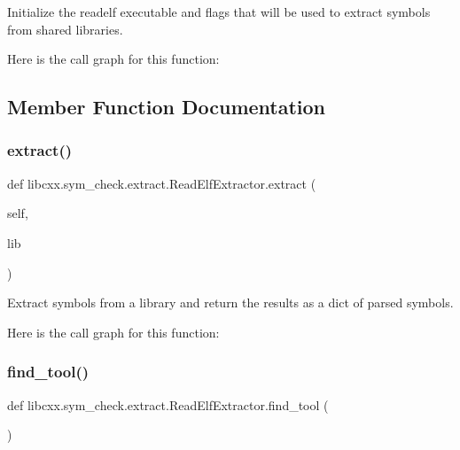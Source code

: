 \begin{DoxyVerb}Initialize the readelf executable and flags that will be used to
extract symbols from shared libraries.
\end{DoxyVerb}
 Here is the call graph for this function\+:


\subsection{Member Function Documentation}
\mbox{\label{classlibcxx_1_1sym__check_1_1extract_1_1_read_elf_extractor_a72a619001676329d5201fd80d40b345b}} 
\subsubsection{\texorpdfstring{extract()}{extract()}}
{\footnotesize\ttfamily def libcxx.\+sym\+\_\+check.\+extract.\+Read\+Elf\+Extractor.\+extract (\begin{DoxyParamCaption}\item[{}]{self,  }\item[{}]{lib }\end{DoxyParamCaption})}

\begin{DoxyVerb}Extract symbols from a library and return the results as a dict of
parsed symbols.
\end{DoxyVerb}
 Here is the call graph for this function\+:
\mbox{\label{classlibcxx_1_1sym__check_1_1extract_1_1_read_elf_extractor_af50a43ed629bbd1bce6488730a6767ac}} 
\subsubsection{\texorpdfstring{find\+\_\+tool()}{find\_tool()}}
{\footnotesize\ttfamily def libcxx.\+sym\+\_\+check.\+extract.\+Read\+Elf\+Extractor.\+find\+\_\+tool (\begin{DoxyParamCaption}{ }\end{DoxyParamCaption})\hspace{0.3cm}{\ttfamily [static]}}

